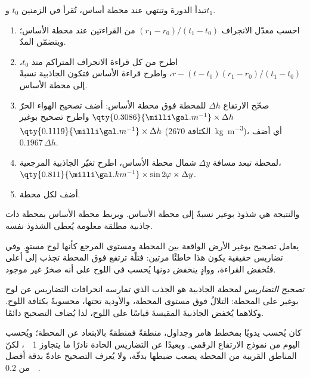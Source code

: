 \begin{method}\label{met:b3:field-lab-methods-3:loop}
تبدأ الدورة وتنتهي عند محطة أساس، تُقرأ في الزمنين $t_0$ و$t_1$.
\begin{enumerate}
  \item احسب معدّل الانجراف $(r_1 - r_0)/(t_1 - t_0)$ من القراءتين
        عند محطة الأساس؛ ويتضمّن المدّ.
  \item اطرح من كل قراءة الانجراف المتراكم منذ $t_0$،
        $r - (t - t_0)(r_1 - r_0)/(t_1 - t_0)$، واطرح قراءة الأساس
        فتكون الجاذبية نسبةً إلى محطة الأساس.
  \item صحّح الارتفاع $\Delta h$ للمحطة فوق محطة الأساس:
        أضف تصحيح الهواء الحرّ $\qty{0.3086}{\milli\gal.m^{-1}}
        \times\Delta h$ واطرح تصحيح بوغير
        $\qty{0.1119}{\milli\gal.m^{-1}}\times\Delta h$ (الكثافة
        \qty{2670}{kg.m^{-3}})، أي أضف $0.1967\,\Delta h$.
  \item لمحطة تبعد مسافة $\Delta y$ شمال محطة الأساس، اطرح
        تغيّر الجاذبية المرجعية، $\qty{0.811}{\milli\gal.km^{-1}}
        \times\sin 2\varphi\times\Delta y$.
  \item أضف  لكل محطة.
\end{enumerate}
والنتيجة هي شذوذ بوغير نسبةً إلى محطة الأساس. وبربط محطة الأساس
بمحطة ذات جاذبية مطلقة معلومة يُعطى الشذوذ نفسه.
\end{method}

يعامل تصحيح بوغير الأرض الواقعة بين المحطة ومستوى
المرجع كأنها لوح مستوٍ. وفي تضاريس حقيقية يكون هذا خاطئًا مرتين:
فتلّة ترتفع فوق المحطة تجذب إلى أعلى فتُخفض
القراءة، ووادٍ ينخفض دونها يُحسب في اللوح على أنه
صخرٌ غير موجود.

\begin{definition}\label{def:b3:field-lab-methods-3:terrain}
\emph{تصحيح التضاريس} لمحطة الجاذبية هو الجذب الذي
تمارسه انحرافات التضاريس عن لوح بوغير على المحطة: التلالُ فوق مستوى المحطة،
والأودية تحتها، محسوبةً بكثافة اللوح.
وكلاهما يُخفض الجاذبيةَ المقيسةَ قياسًا على اللوح،
لذا يُضاف التصحيح
دائمًا.
\end{definition}

كان يُحسب يدويًا بمخطط هامر وجداول، منطقةً فمنطقةً
بالابتعاد عن المحطة؛ ويُحسب اليوم من نموذج الارتفاع الرقمي.
وبعيدًا عن التضاريس الحادة نادرًا ما يتجاوز \qty{1}{\milli\gal}،
لكنّ المناطق القريبة من المحطة يصعب ضبطها بدقّة،
ولا يُعرف التصحيح عادةً بدقة أفضل من \qty{0.2}{\milli\gal}.

